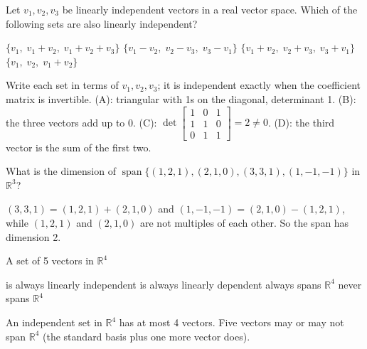 \begin{question}[id=basis-2, type=msq, marks=2]
Let $v_1, v_2, v_3$ be linearly independent vectors in a real vector space. Which of the following sets are also linearly independent?
\begin{options}
  \correct $\{v_1,\; v_1 + v_2,\; v_1 + v_2 + v_3\}$
  \option $\{v_1 - v_2,\; v_2 - v_3,\; v_3 - v_1\}$
  \correct $\{v_1 + v_2,\; v_2 + v_3,\; v_3 + v_1\}$
  \option $\{v_1,\; v_2,\; v_1 + v_2\}$
\end{options}
\begin{solution}
Write each set in terms of $v_1, v_2, v_3$; it is independent exactly when the coefficient matrix is invertible. (A): triangular with 1s on the diagonal, determinant 1. (B): the three vectors add up to 0. (C): $\det \begin{bmatrix} 1 & 0 & 1 \\ 1 & 1 & 0 \\ 0 & 1 & 1 \end{bmatrix} = 2 \ne 0$. (D): the third vector is the sum of the first two.
\end{solution}
\end{question}

\begin{question}[id=basis-3]
What is the dimension of $\operatorname{span}\{(1, 2, 1), (2, 1, 0), (3, 3, 1), (1, -1, -1)\}$ in $\mathbb{R}^3$?
\begin{solution}
$(3, 3, 1) = (1, 2, 1) + (2, 1, 0)$ and $(1, -1, -1) = (2, 1, 0) - (1, 2, 1)$, while $(1, 2, 1)$ and $(2, 1, 0)$ are not multiples of each other. So the span has dimension 2.
\end{solution}
\end{question}

\begin{question}[id=basis-4]
A set of 5 vectors in $\mathbb{R}^4$
\begin{options}
  \option is always linearly independent
  \correct is always linearly dependent
  \option always spans $\mathbb{R}^4$
  \option never spans $\mathbb{R}^4$
\end{options}
\begin{solution}
An independent set in $\mathbb{R}^4$ has at most 4 vectors. Five vectors may or may not span $\mathbb{R}^4$ (the standard basis plus one more vector does).
\end{solution}
\end{question}

